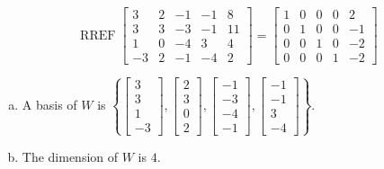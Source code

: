 \begin{exerciseAnswer} 


\[\operatorname{RREF} \left[\begin{array}{ccccc}
3 & 2 & -1 & -1 & 8 \\
3 & 3 & -3 & -1 & 11 \\
1 & 0 & -4 & 3 & 4 \\
-3 & 2 & -1 & -4 & 2
\end{array}\right] = \left[\begin{array}{ccccc}
1 & 0 & 0 & 0 & 2 \\
0 & 1 & 0 & 0 & -1 \\
0 & 0 & 1 & 0 & -2 \\
0 & 0 & 0 & 1 & -2
\end{array}\right] \]


\begin{enumerate}[(a)]
\item A basis of \(W\) is \( \left\{ \left[\begin{array}{c}
3 \\
3 \\
1 \\
-3
\end{array}\right] , \left[\begin{array}{c}
2 \\
3 \\
0 \\
2
\end{array}\right] , \left[\begin{array}{c}
-1 \\
-3 \\
-4 \\
-1
\end{array}\right] , \left[\begin{array}{c}
-1 \\
-1 \\
3 \\
-4
\end{array}\right] \right\} \).
\item The dimension of \(W\) is \( 4 \).
\end{enumerate}
    
\end{exerciseAnswer}
    
